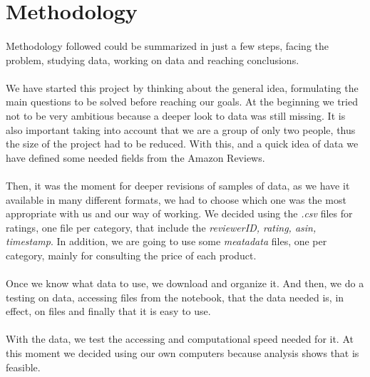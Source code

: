 \documentclass[11pt]{article}
\begin{document}
\section{Methodology}
\paragraph{}
Methodology followed could be summarized in just a few steps, facing the problem, studying data, working on data and reaching conclusions.

\paragraph{}
We have started this project by thinking about the general idea, formulating the main questions to be solved before reaching our goals. At the beginning we tried not to be very ambitious because a deeper look to data was still missing. It is also important taking into account that we are a group of only two people, thus the size of the project had to be reduced. With this, and a quick idea of data we have defined some needed fields from the Amazon Reviews.

\paragraph{}
Then, it was the moment for deeper revisions of samples of data, as we have it available in many different formats, we had to choose which one was the most appropriate with us and our way of working. We decided using the {\em.csv} files for ratings, one file per category, that include the {\em reviewerID, rating, asin, timestamp}. In addition, we are going to use some {\em meatadata} files, one per category, mainly for consulting the price of each product.

\paragraph{}
Once we know what data to use, we download and organize it. And then, we do a testing on data, accessing files from the notebook, that the data needed is, in effect, on files and finally that it is easy to use.

\paragraph{}
With the data, we test the accessing and computational speed needed for it. At this moment we decided using our own computers because analysis shows that is feasible.
\end{document}
